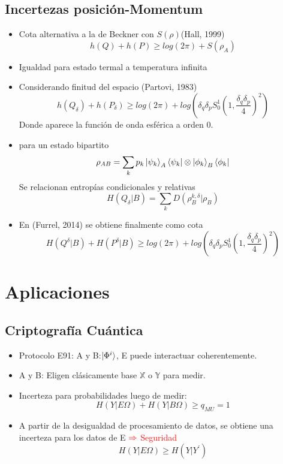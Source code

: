 \documentclass{book}
\begin{document}
\subsection{Incertezas posición-Momentum}
\begin{itemize}
\item Cota alternativa a la de Beckner con $S(\rho)$(Hall, 1999) 
\begin{equation} \label{eq19} h(Q) + h(P) \geq log(2\pi)+S(\rho_A) \end{equation}
\item Igualdad para estado termal a temperatura infinita
\item Considerando finitud del espacio (Partovi, 1983)
\begin{equation} \label{eq20} h(Q_\delta) + h(P_\delta) \geq log(2\pi)+log(\delta_q\delta_pS_0^1(1,\frac{\delta_q\delta_p}{4} )^2) \end{equation}
Donde aparece la función de onda esférica a orden 0.
\item para un estado bipartito
 \begin{equation} \label{eq21} \rho_{AB}=\sum_k p_k \ket{\psi_k}_A \bra{\psi_k} \otimes \ket{\phi_k}_B\bra{\phi_k} \end{equation}
Se relacionan entropías condicionales y relativas
\begin{equation} \label{eq22} H(Q_\delta|B) =\sum_k D(\rho_B^{k, \delta} |\rho_B) \end{equation}
\item En (Furrel, 2014) se obtiene finalmente como cota
\begin{equation} \label{eq23} H(Q^\delta|B)+H(P^\delta|B) \geq log(2\pi)+log(\delta_q\delta_pS_0^1(1,\frac{\delta_q\delta_p}{4} )^2) \end{equation}
\end{itemize}
\section{Aplicaciones}
\subsection{Criptografía Cuántica}
\begin{itemize}
    \item Protocolo E91: A y B:$\ket{\Phi^i}$, E puede interactuar coherentemente.
    \item A y B: Eligen clásicamente base $\mathbb{X}$ o $\mathbb{Y}$ para medir.
    \item Incerteza para probabilidades luego de medir:
    \begin{equation}\label{eq24} H(Y|E\Omega)+H(Y|B\Omega) \geq q_{MU}=1 \end{equation}
    \item A partir de la desigualdad de procesamiento de datos, se obtiene una incerteza para los datos de E $\textcolor{red}{\Rightarrow}$ \textcolor{red}{Seguridad}
    \begin{equation} \label{eq25} H(Y|E\Omega) \geq H(Y|Y^\prime) \end{equation} 
\end{itemize}
\end{document}
